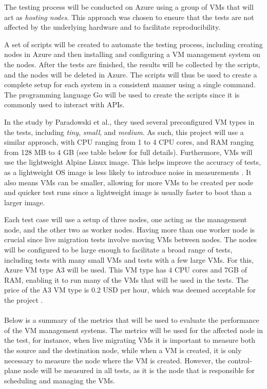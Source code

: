\documentclass{article}
\begin{document}
The testing process will be conducted on Azure using a group of VMs that will act as \textit{hosting nodes}. This approach was chosen to ensure that the tests are not affected by the underlying hardware and to facilitate reproducibility. 

A set of scripts will be created to automate the testing process, including creating nodes in Azure and then installing and configuring a VM management system on the nodes. After the tests are finished, the results will be collected by the scripts, and the nodes will be deleted in Azure. The scripts will thus be used to create a complete setup for each system in a consistent manner using a single command. The programming language Go will be used to create the scripts since it is commonly used to interact with APIs. 

In the study by Paradowski et al., they used several preconfigured VM types in the tests, including \textit{tiny}, \textit{small}, and \textit{medium}. As such, this project will use a similar approach, with CPU ranging from 1 to 4 CPU cores, and RAM ranging from 128 MB to 4 GB (see table below for full details). Furthermore, VMs will use the lightweight Alpine Linux image. This helps improve the accuracy of tests, as a lightweight OS image is less likely to introduce noise in measurements \cite{linux-boot-time}. It also means VMs can be smaller, allowing for more VMs to be created per node and quicker test runs since a lightweight image is usually faster to boot than a larger image.

Each test case will use a setup of three nodes, one acting as the management node, and the other two as worker nodes. Having more than one worker node is crucial since live migration tests involve moving VMs between nodes. The nodes will be configured to be large enough to facilitate a broad range of tests, including tests with many small VMs and tests with a few large VMs. For this, Azure VM type A3 will be used. This VM type has 4 CPU cores and 7GB of RAM, enabling it to run many of the VMs that will be used in the tests. The price of the A3 VM type is 0.2 USD per hour, which was deemed acceptable for the project \cite{azure-pricing}.
\\~\\
Below is a summary of the metrics that will be used to evaluate the performance of the VM management systems. The metrics will be used for the affected node in the test, for instance, when live migrating VMs it is important to measure both the source and the destination node, while when a VM is created, it is only necessary to measure the node where the VM is created. However, the control-plane node will be measured in all tests, as it is the node that is responsible for scheduling and managing the VMs. 
\end{document}
